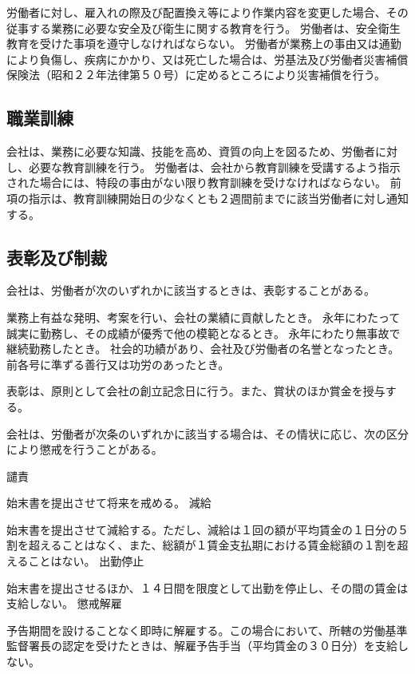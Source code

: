 \documentclass[10pt,a4paper,uplatex]{jsarticle}
\begin{document}
労働者に対し、雇入れの際及び配置換え等により作業内容を変更した場合、その従事する業務に必要な安全及び衛生に関する教育を行う。
\term
労働者は、安全衛生教育を受けた事項を遵守しなければならない。
労働者が業務上の事由又は通勤により負傷し、疾病にかかり、又は死亡した場合は、労基法及び労働者災害補償保険法（昭和２２年法律第５０号）に定めるところにより災害補償を行う。

\subsection{職業訓練}

会社は、業務に必要な知識、技能を高め、資質の向上を図るため、労働者に対し、必要な教育訓練を行う。
\term
労働者は、会社から教育訓練を受講するよう指示された場合には、特段の事由がない限り教育訓練を受けなければならない。
\term
前項の指示は、教育訓練開始日の少なくとも２週間前までに該当労働者に対し通知する。

\subsection{表彰及び制裁}

会社は、労働者が次のいずれかに該当するときは、表彰することがある。
\begin{enumerate}
    \itm 業務上有益な発明、考案を行い、会社の業績に貢献したとき。
    \itm 永年にわたって誠実に勤務し、その成績が優秀で他の模範となるとき。
    \itm 永年にわたり無事故で継続勤務したとき。
    \itm 社会的功績があり、会社及び労働者の名誉となったとき。
    \itm 前各号に準ずる善行又は功労のあったとき。
\end{enumerate}
\term
表彰は、原則として会社の創立記念日に行う。また、賞状のほか賞金を授与する。

会社は、労働者が次条のいずれかに該当する場合は、その情状に応じ、次の区分により懲戒を行うことがある。
\begin{enumerate}
    \itm 譴責\par 始末書を提出させて将来を戒める。
    \itm 減給\par 始末書を提出させて減給する。ただし、減給は１回の額が平均賃金の１日分の５割を超えることはなく、また、総額が１賃金支払期における賃金総額の１割を超えることはない。
    \itm 出勤停止\par 始末書を提出させるほか、１４日間を限度として出勤を停止し、その間の賃金は支給しない。
    \itm 懲戒解雇\par 予告期間を設けることなく即時に解雇する。この場合において、所轄の労働基準監督署長の認定を受けたときは、解雇予告手当（平均賃金の３０日分）を支給しない。
\end{enumerate}
\end{document}
